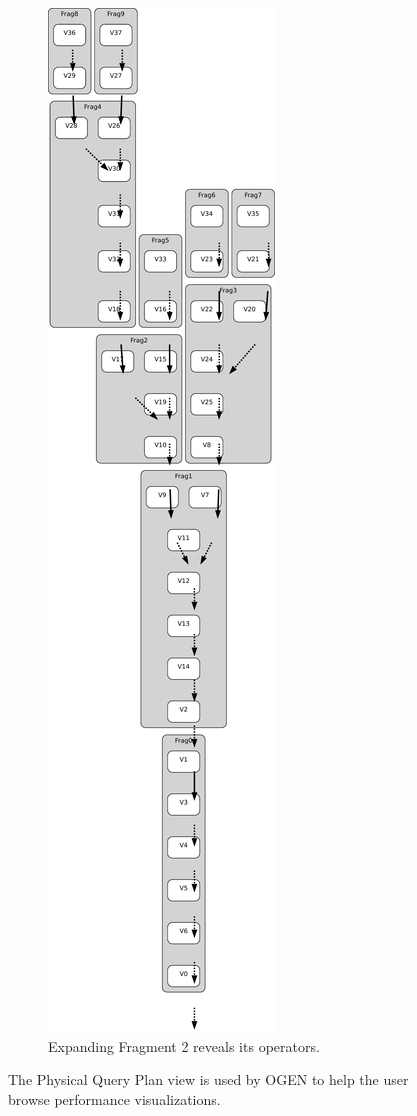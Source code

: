 \documentclass{chi2009}
\newcommand*{\system}{OGEN\xspace}
\newcommand*{\graph}{Physical Query Plan\xspace}
\begin{document}
\begin{figure}[ht]
\begin{subfigure}[b]{0.49\columnwidth}
    \includegraphics[width=0.8\columnwidth]{images/graph_expanded}
    \caption{Expanding Fragment 2 reveals its operators.}
    \label{fig:graph_expanded}
  \end{subfigure}
  \caption{The \graph view is used by \system to help the user browse performance visualizations.}
  \label{fig:graph}
\end{figure}
\end{document}
